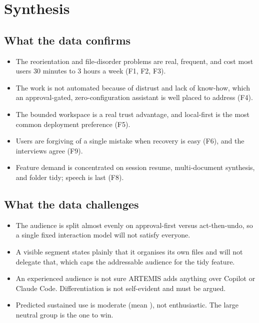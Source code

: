\documentclass[11pt]{article}
\begin{document}
\section{Synthesis}
\label{sec:synth}

\subsection{What the data confirms}
\begin{itemize}
  \item The reorientation and file-disorder problems are real, frequent, and cost most users
        30 minutes to 3 hours a week (F1, F2, F3).
  \item The work is not automated because of distrust and lack of know-how, which an
        approval-gated, zero-configuration assistant is well placed to address (F4).
  \item The bounded workspace is a real trust advantage, and local-first is the most common
        deployment preference (F5).
  \item Users are forgiving of a single mistake when recovery is easy (F6), and the interviews
        agree (F9).
  \item Feature demand is concentrated on session resume, multi-document synthesis, and folder
        tidy; speech is last (F8).
\end{itemize}

\subsection{What the data challenges}
\begin{itemize}
  \item The audience is split almost evenly on approval-first versus act-then-undo, so a single
        fixed interaction model will not satisfy everyone.
  \item A visible segment states plainly that it organises its own files and will not delegate
        that, which caps the addressable audience for the tidy feature.
  \item An experienced audience is not sure ARTEMIS adds anything over Copilot or Claude Code.
        Differentiation is not self-evident and must be argued.
  \item Predicted sustained use is moderate (mean \MeanLikelyUse{}), not enthusiastic. The
        large neutral group is the one to win.
\end{itemize}
\end{document}
